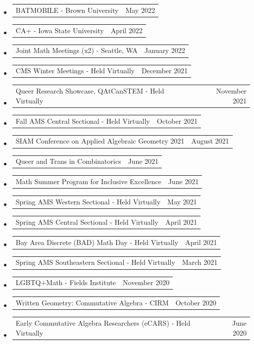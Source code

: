 \documentclass[letterpaper,11pt]{article}
\makeatletter
\newcommand{\ressubheadingTalk}[2]{
\begin{tabular*}{6.5in}[t]{l@{\cftdotfill{\cftsecdotsep}\extracolsep{\fill}}r}
		#1 & #2 \\
\end{tabular*}\vspace{-6pt}}
\makeatother
\begin{document}
\begin{itemize}
\item
	\ressubheadingTalk{BATMOBILE - Brown University}{May 2022}
	
\item
	\ressubheadingTalk{CA+ - Iowa State University}{April 2022}

\item
	\ressubheadingTalk{Joint Math Meetings (x2) - Seattle, WA}{January 2022}\footnotemark[2]

\item
	\ressubheadingTalk{CMS Winter Meetings - Held Virtually}{December 2021}
		
\item
	\ressubheadingTalk{Queer Research Showcase, QAtCanSTEM  - Held Virtually}{November 2021}
	
\item
	\ressubheadingTalk{Fall AMS Central Sectional - Held Virtually}{October 2021}
	
\item
	\ressubheadingTalk{SIAM Conference on Applied Algebraic Geometry 2021}{August 2021}

\item
	\ressubheadingTalk{Queer and Trans in Combinatorics}{June 2021}
		
\item
	\ressubheadingTalk{Math Summer Program for Inclusive Excellence}{June 2021}
	
\item
	\ressubheadingTalk{Spring AMS Western Sectional - Held Virtually}{May 2021}

\item
	\ressubheadingTalk{Spring AMS Central Sectional - Held Virtually}{April 2021}
	
\item
	\ressubheadingTalk{Bay Area Discrete (BAD) Math Day - Held Virtually}{April 2021}
	
\item
	\ressubheadingTalk{Spring AMS Southeastern Sectional - Held Virtually}{March 2021}
	
\item
	\ressubheadingTalk{LGBTQ+Math - Fields Institute}{November 2020}

\item
	\ressubheadingTalk{Written Geometry: Commutative Algebra - CIRM}{October 2020}\footnotemark[2]
		
\item
	\ressubheadingTalk{Early Commutative Algebra Researchers (eCARS) - Held Virtually}{June 2020}


\end{itemize}
\end{document}
